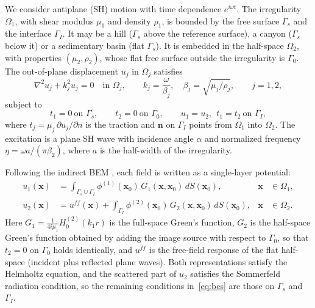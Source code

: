 We consider antiplane (SH) motion with time dependence $e^{i\omega t}$. The
irregularity $\Omega_1$, with shear modulus $\mu_1$ and density $\rho_1$, is
bounded by the free surface $\Gamma_s$ and the interface $\Gamma_I$. It may be a
hill ($\Gamma_s$ above the reference surface), a canyon ($\Gamma_s$ below it) or
a sedimentary basin (flat $\Gamma_s$). It is embedded in the half-space
$\Omega_2$, with properties $(\mu_2,\rho_2)$, whose flat free surface outside the
irregularity is $\Gamma_0$. The out-of-plane displacement $u_j$ in $\Omega_j$ satisfies
\begin{equation}
  \nabla^2 u_j + k_j^2 u_j = 0 \quad \text{in } \Omega_j,
  \qquad k_j = \frac{\omega}{\beta_j},\quad \beta_j = \sqrt{\mu_j/\rho_j},
  \qquad j = 1,2,
\end{equation}
subject to
\begin{equation}\label{eq:bcs}
  t_1 = 0 \ \text{on } \Gamma_s, \qquad
  t_2 = 0 \ \text{on } \Gamma_0, \qquad
  u_1 = u_2,\ \ t_1 = t_2 \ \text{on } \Gamma_I,
\end{equation}
where $t_j = \mu_j\,\partial u_j/\partial n$ is the traction and $\mathbf{n}$ on
$\Gamma_I$ points from $\Omega_1$ into $\Omega_2$. The excitation is a plane SH
wave with incidence angle $\alpha$ and normalized frequency
$\eta = \omega a/(\pi\beta_2)$, where $a$ is the half-width of the irregularity.

Following the indirect BEM \citep{SanchezSesma1991,wu_novel_2026}, each field
is written as a single-layer potential:
\begin{align}
  u_1(\mathbf{x}) &= \int_{\Gamma_s\cup\Gamma_I}
     \phi^{(1)}(\mathbf{x}_0)\, G_1(\mathbf{x},\mathbf{x}_0)\, dS(\mathbf{x}_0),
     & \mathbf{x}&\in\Omega_1, \label{eq:u1}\\
  u_2(\mathbf{x}) &= u^{f\!f}(\mathbf{x}) + \int_{\Gamma_I}
     \phi^{(2)}(\mathbf{x}_0)\, G_2(\mathbf{x},\mathbf{x}_0)\, dS(\mathbf{x}_0),
     & \mathbf{x}&\in\Omega_2. \label{eq:u2}
\end{align}
Here $G_1 = \frac{1}{4i\mu_1}H_0^{(2)}(k_1 r)$ is the full-space Green's function,
$G_2$ is the half-space Green's function obtained by adding the image source
with respect to $\Gamma_0$, so that $t_2=0$ on $\Gamma_0$ holds identically, and
$u^{f\!f}$ is the free-field response of the flat half-space (incident plus
reflected plane waves). Both representations satisfy the Helmholtz equation, and
the scattered part of $u_2$ satisfies the Sommerfeld radiation condition, so
the remaining conditions in~\eqref{eq:bcs} are those on $\Gamma_s$ and $\Gamma_I$.


